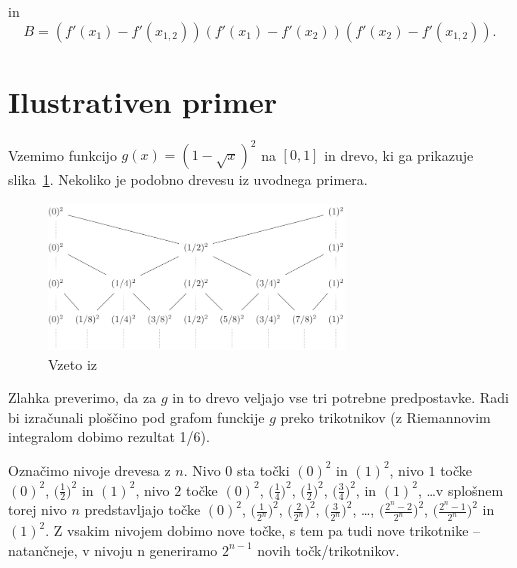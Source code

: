 \documentclass[a4paper, 12pt, titlepage]{article}
\begin{document}
in
$$
B = (f'(x_1) - f'(x_{1,2}))(f'(x_1) - f'(x_2))(f'(x_2) - f'(x_{1,2}))\text{.}
$$




\section{Ilustrativen primer} \label{ilustrativen_primer}

Vzemimo funkcijo $ g(x) = (1 - \sqrt{x})^2 $ na $ [0, 1] $ in drevo, ki ga prikazuje slika~\ref{ilustrativen_primer_drevo}. Nekoliko je podobno drevesu iz uvodnega primera.

\begin{figure}[h]
    \centering
    \includegraphics[width=0.7\textwidth]{slike/ilustrativen_primer_drevo.png}
    \caption{Vzeto iz~\cite{osnovni_clanek}}
    \label{ilustrativen_primer_drevo}
\end{figure}

Zlahka preverimo, da za $ g $ in to drevo veljajo vse tri potrebne predpostavke. Radi bi izračunali ploščino pod grafom funckije $ g $ preko trikotnikov (z Riemannovim integralom dobimo rezultat 1/6).

Označimo nivoje drevesa z $ n $. Nivo $ 0 $ sta točki $ (0)^2 $ in $ (1)^2 $, nivo $ 1 $ točke $ (0)^2 $, $ \bigl(\frac{1}{2}\bigr)^2 $ in $ (1)^2 $, nivo $ 2 $ točke $ (0)^2 $, $ \bigl(\frac{1}{4}\bigr)^2 $, $ \bigl(\frac{1}{2}\bigr)^2 $, $ \bigl(\frac{3}{4}\bigr)^2 $, in $ (1)^2 $, \ldots v splošnem torej nivo $ n $ predstavljajo točke $ (0)^2 $, $ \bigl(\frac{1}{2^n}\bigr)^2 $, $ \bigl(\frac{2}{2^n}\bigr)^2 $, $ \bigl(\frac{3}{2^n}\bigr)^2 $, \ldots, $ \bigl(\frac{2^n-2}{2^n}\bigr)^2 $, $ \bigl(\frac{2^n-1}{2^n}\bigr)^2 $ in $ (1)^2 $. Z vsakim nivojem dobimo nove točke, s tem pa tudi nove trikotnike -- natančneje, v nivoju n generiramo $ 2^{n-1} $ novih točk/trikotnikov.
\end{document}
